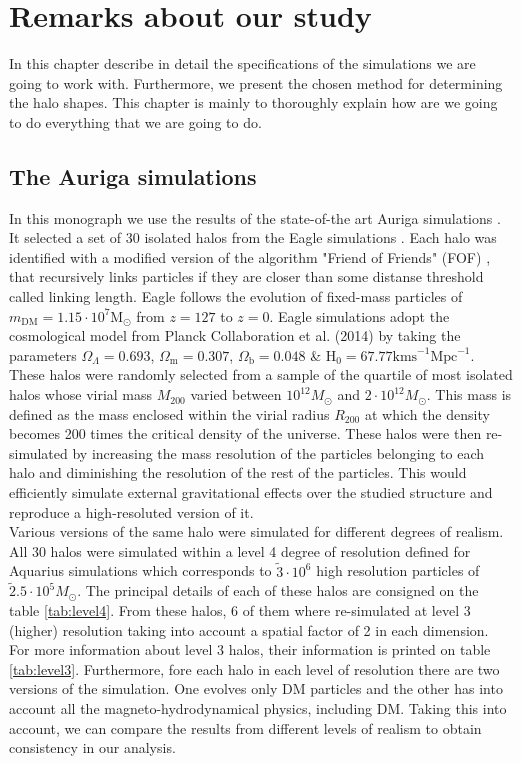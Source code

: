 \chapter{Remarks about our study}
In this chapter describe in detail the specifications of the simulations we are going to work with. Furthermore, we present the chosen method for determining the halo shapes. This chapter is mainly to thoroughly explain how are we going to do everything that we are going to do.\\

\section{The Auriga simulations}
In this monograph we use the results of the state-of-the art Auriga simulations \cite{Auriga}. It selected a set of 30 isolated halos from the Eagle simulations \cite{Eagle}. Each halo was identified with a modified version of the algorithm "Friend of Friends" (FOF) \cite{FOF}, that recursively links particles if they are closer than some distanse threshold called linking length. Eagle follows the evolution of fixed-mass particles of $m_{\text{DM}} = 1.15\cdot 10^7\text{M}_{\odot}$ from $z=127$ to $z=0$. Eagle simulations adopt the cosmological model from Planck Collaboration et al. (2014) by taking the parameters $\Omega_\Lambda=0.693$, $\Omega_\text{m}=0.307$, $\Omega_\text{b}=0.048$ \& $\text{H}_0=67.77\text{kms} ^{-1}\text{Mpc}^{-1}$.\\

These halos were randomly selected from a sample of the quartile of most isolated halos whose virial mass $M_{200}$ varied between $10^{12}M_\odot$ and $2\cdot 10^{12}M_\odot$. This mass is defined as the mass enclosed within the virial radius $R_{200}$ at which the density becomes 200 times the critical density of the universe. These halos were then re-simulated by increasing the mass resolution of the particles belonging to each halo and diminishing the resolution of the rest of the particles. This would efficiently simulate external gravitational effects over the studied structure and reproduce a high-resoluted version of it.\\

Various versions of the same halo were simulated for different degrees of realism. All 30 halos were simulated within a level 4 degree of resolution defined for Aquarius simulations which corresponds to $\tilde 3\cdot 10^6$ high resolution particles of $\tilde 2.5 \cdot 10^5 M_\odot$. The principal details of each of these halos are consigned on the table \ref{tab:level4}. From these halos, 6 of them where re-simulated at level 3 (higher) resolution taking into account a spatial factor of 2 in each dimension. For more information about level 3 halos, their information is printed on table \ref{tab:level3}. Furthermore, fore each halo in each level of resolution there are two versions of the simulation. One evolves only DM particles and the other has into account all the magneto-hydrodynamical physics, including DM. Taking this into account, we can compare the results from different levels of realism to obtain consistency in our analysis.\\

